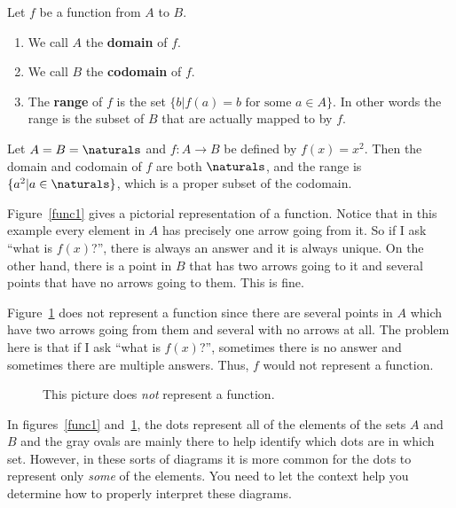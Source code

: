\begin{df}
Let $f$ be a function from $A$ to $B$.
\begin{enumerate}
\item
We call $A$ the {\bf domain} of $f$.
\item
We call $B$ the {\bf codomain} of $f$.
\item 
The {\bf range} of $f$ is the set $\{b | f(a)=b \mbox{ for some } a\in A\}$.
In other words the range is the subset of $B$ that are actually mapped to by $f$.
\end{enumerate}
\end{df}

\begin{exa}
Let $A= B=\naturals$ and $f:A\to B$ be defined by $f(x)=x^2$.
Then the domain and codomain of $f$ are both $\naturals$, and the range is 
$\{a^2| a\in \naturals\}$, which is a proper subset of the codomain.
\end{exa}

Figure~\ref{func1} gives a pictorial representation of a function.  Notice that in this example 
every element in $A$ has precisely one arrow going from it. 
So if I ask ``what is $f(x)$?'', there is always an answer and it is always unique.
On the other hand, there is a point in $B$ that has two arrows going to it and several points
that have no arrows going to them.  This is fine.
 
Figure~\ref{funcNot} does not represent a function since there are several points in $A$ which
have two arrows going from them and several with no arrows at all.
The problem here is that if I ask ``what is $f(x)$?'', sometimes there is no answer and sometimes
there are multiple answers.  Thus, $f$ would not represent a function. 

\begin{figure}[ht]
\centering
\begin{minipage}{2in}

\footnotesize\caption{Pictorial representation of a function from $A$ to $B$.} \label{func1}
\end{minipage}
\hspace*{1in}
\begin{minipage}{2in}

\footnotesize\caption{This picture does {\em not} represent a function.} \label{funcNot}
\end{minipage}
\end{figure}

\begin{rem}
In figures~\ref{func1} and~\ref{funcNot}, the dots represent all of the elements of the
sets $A$ and $B$ and the gray ovals are mainly there to help identify which dots are in which set.
However, in these sorts of diagrams it is more common for the dots to represent only {\em some} of the elements.
You need to let the context help you determine how to properly interpret these diagrams.
\end{rem}



